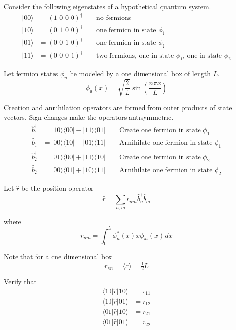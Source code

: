 \documentclass[12pt]{article}
\begin{document}
\noindent
Consider the following eigenstates of a hypothetical quantum system.
\begin{align*}
|00\rangle&=(\text{1 0 0 0})^\dag\qquad\text{no fermions}\\
|10\rangle&=(\text{0 1 0 0})^\dag\qquad\text{one fermion in state $\phi_1$}\\
|01\rangle&=(\text{0 0 1 0})^\dag\qquad\text{one fermion in state $\phi_2$}\\
|11\rangle&=(\text{0 0 0 1})^\dag\qquad\text{two fermions, one in state $\phi_1$, one in state $\phi_2$}
\end{align*}

\noindent
Let fermion states $\phi_n$ be modeled by a one dimensional box of length $L$.
\begin{equation*}
\phi_n(x)=\sqrt{\frac{2}{L}}\sin\left(\frac{n\pi x}{L}\right)
\end{equation*}

\noindent
Creation and annihilation operators are formed from outer products of state vectors.
Sign changes make the operators antisymmetric.
\begin{align*}
\hat{b}_1^\dag&=|10\rangle\langle00|-|11\rangle\langle01| \qquad\text{Create one fermion in state $\phi_1$}
\\
\hat{b}_1&=|00\rangle\langle10|-|01\rangle\langle11| \qquad\text{Annihilate one fermion in state $\phi_1$}
\\
\hat{b}_2^\dag&=|01\rangle\langle00|+|11\rangle\langle10| \qquad\text{Create one fermion in state $\phi_2$}
\\
\hat{b}_2&=|00\rangle\langle01|+|10\rangle\langle11| \qquad\text{Annihilate one fermion in state $\phi_2$}
\end{align*}

\noindent
Let $\hat{r}$ be the position operator
\begin{equation*}
\hat{r}=\sum_{n,m}r_{nm}\hat{b}_n^\dag\hat{b}_m
\end{equation*}

\noindent
where
\begin{equation*}
r_{nm}=\int_0^L\phi_n^*(x)x\phi_m(x)\,dx
\end{equation*}

\noindent
Note that for a one dimensional box
\begin{equation*}
r_{nn}=\langle x\rangle=\tfrac{1}{2}L
\end{equation*}

\noindent
Verify that
\begin{align*}
\langle10|\hat{r}|10\rangle&=r_{11}\\
\langle10|\hat{r}|01\rangle&=r_{12}\\
\langle01|\hat{r}|10\rangle&=r_{21}\\
\langle01|\hat{r}|01\rangle&=r_{22}
\end{align*}
\end{document}
